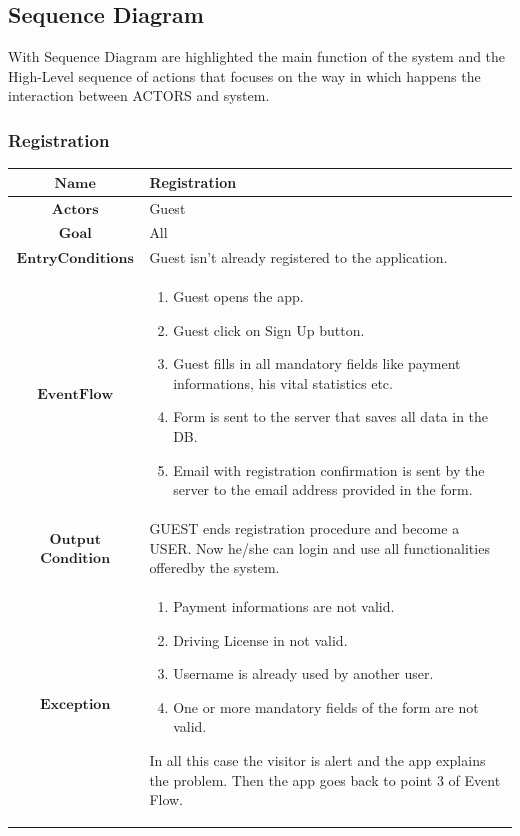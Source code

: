 \subsection{Sequence Diagram}

With Sequence Diagram are highlighted the main function of the system
and the High-Level sequence of actions that focuses on the way in
which happens the interaction between ACTORS and system.

\subsubsection{Registration}
\begin{flushleft}
\begin{tabular}{|c|>{\raggedright}p{10cm}|}
\hline 
$\boldsymbol{\mathbf{Name}}$ & Registration\tabularnewline
\hline 
$\mathbf{Actors}$ & Guest\tabularnewline
\hline 
$\mathbf{Goal}$ & All\tabularnewline
\hline 
$\mathbf{EntryConditions}$ & Guest isn't already registered to the application.\tabularnewline
\hline 
$\mathbf{EventFlow}$ & \begin{enumerate}
\item Guest opens the app.
\item Guest click on Sign Up button.
\item Guest fills in all mandatory fields like payment informations, his
vital statistics etc.
\item Form is sent to the server that saves all data in the DB.
\item Email with registration confirmation is sent by the server to the
email address provided in the form.
\end{enumerate}
\tabularnewline
\hline 
$\mathbf{Output}$ $\mathbf{Condition}$ & GUEST ends registration procedure and become a USER. Now he/she can
login and use all functionalities offeredby the system.\tabularnewline
\hline 
$\mathbf{Exception}$ & \begin{enumerate}
\item Payment informations are not valid.
\item Driving License in not valid.
\item Username is already used by another user.
\item One or more mandatory fields of the form are not valid.
\end{enumerate}
In all this case the visitor is alert and the app explains the problem.
Then the app goes back to point 3 of Event Flow.\tabularnewline
\hline 
\end{tabular}\\
\par\end{flushleft}

